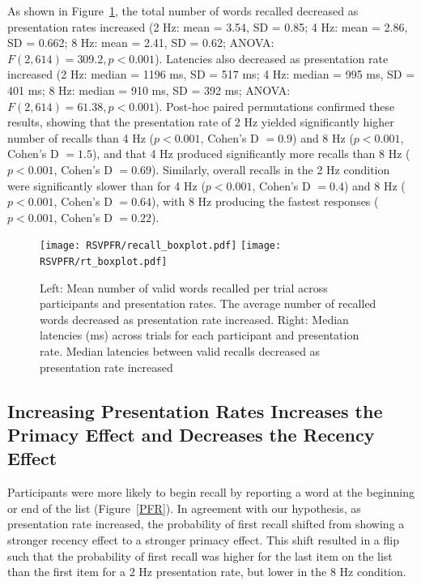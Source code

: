 \documentclass[10pt,letterpaper]{article}
\begin{document}
As shown in Figure~\ref{Descriptives}, the total number of words recalled decreased as presentation rates increased (2 Hz: mean = 3.54, SD = 0.85; 4 Hz: mean = 2.86, SD = 0.662; 8 Hz: mean = 2.41, SD = 0.62; ANOVA: $F(2, 614) = 309.2, p < 0.001$). Latencies also decreased as presentation rate increased (2 Hz: median = 1196 ms, SD = 517 ms; 4 Hz: median = 995 ms, SD = 401 ms; 8 Hz: median = 910 ms, SD = 392 ms; ANOVA: $F(2, 614) = 61.38, p < 0.001$). Post-hoc paired permutations confirmed these results, showing that the presentation rate of 2 Hz yielded significantly higher number of recalls than 4 Hz ($p < 0.001$, Cohen's D $= 0.9$) and 8 Hz ($p < 0.001$, Cohen's D $= 1.5$), and that 4 Hz produced significantly more recalls than 8 Hz ($p < 0.001$, Cohen's D $= 0.69$). Similarly, overall recalls in the 2 Hz condition were significantly slower than for 4 Hz ($p < 0.001$, Cohen's D $= 0.4$) and 8 Hz ($p < 0.001$, Cohen's D $= 0.64$), with 8 Hz producing the fastest responses ($p < 0.001$, Cohen's D $= 0.22$). 

\begin{figure}[H]
\begin{center}
\texttt{[image: RSVPFR/recall\_boxplot.pdf]}
\texttt{[image: RSVPFR/rt\_boxplot.pdf]}
\end{center}
\caption{Left: Mean number of valid words recalled per trial across participants and presentation rates. The average number of recalled words decreased as presentation rate increased. Right: Median latencies (ms) across trials for each participant and presentation rate. Median latencies between valid recalls decreased as presentation rate increased} 
\label{Descriptives}
\end{figure}

\subsection{Increasing Presentation Rates Increases the Primacy Effect and Decreases the Recency Effect}


Participants were more likely to begin recall by reporting a word at the beginning or end of the list (Figure~\ref{PFR}). In agreement with our hypothesis, as presentation rate increased, the probability of first recall shifted from showing a stronger recency effect to a stronger primacy effect. This shift resulted in a flip such that the probability of first recall was higher for the last item on the list than the first item for a 2 Hz presentation rate, but lower in the 8 Hz condition.
\end{document}
